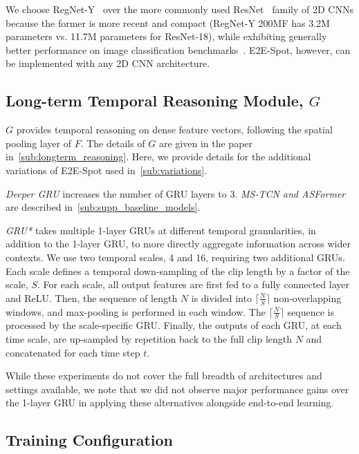 \documentclass[runningheads]{llncs}
\newcommand{\notation}[1]{\ensuremath{#1}\xspace}
\newcommand{\OURMETHOD}{{E2E-Spot}\xspace}
\newcommand{\NumFrames}{\notation{N}}
\newcommand{\Time}{\notation{t}}
\newcommand{\FeatureExtractor}{\notation{F}}
\newcommand{\TemporalArchitecture}{\notation{G}}
\begin{document}
We choose RegNet-Y~\cite{regnet} over the more commonly used ResNet~\cite{resnet} family of 2D CNNs because the former is more recent and compact (RegNet-Y 200MF has 3.2M parameters vs. 11.7M parameters for ResNet-18), while exhibiting generally better performance on image classification benchmarks~\cite{timm}.
\OURMETHOD, however, can be implemented with any 2D CNN architecture.

\subsection{Long-term Temporal Reasoning Module, \TemporalArchitecture}

\TemporalArchitecture provides temporal reasoning on dense feature vectors, following the spatial pooling layer of \FeatureExtractor.
The details of \TemporalArchitecture are given in the paper in~\autoref{sub:longterm_reasoning}.
Here, we provide details for the additional variations of \OURMETHOD used in~\autoref{sub:variations}.

\textit{Deeper GRU} increases the number of GRU layers to 3.
\textit{MS-TCN and ASFormer} are described in~\autoref{sub:supp_baseline_models}.

\textit{GRU*} takes multiple 1-layer GRUs at different temporal granularities, in addition to the 1-layer GRU, to more directly aggregate information across wider contexts.
We use two temporal scales, 4 and 16, requiring two additional GRUs.
Each scale defines a temporal down-sampling of the clip length by a factor of the scale, $S$.
For each scale, all output features are first fed to a fully connected layer and ReLU. Then, the sequence of length $\NumFrames$ is divided into $\lceil \frac{\NumFrames}{S} \rceil$ non-overlapping windows, and max-pooling is performed in each window.
The $\lceil \frac{\NumFrames}{S} \rceil$ sequence is processed by the scale-specific GRU.
Finally, the outputs of each GRU, at each time scale, are up-sampled by repetition back to the full clip length $\NumFrames$ and concatenated for each time step $\Time$.

While these experiments do not cover the full breadth of architectures and settings available, we note that we did not observe major performance gains over the 1-layer GRU in applying these alternatives alongside end-to-end learning.

\subsection{Training Configuration}
\end{document}
